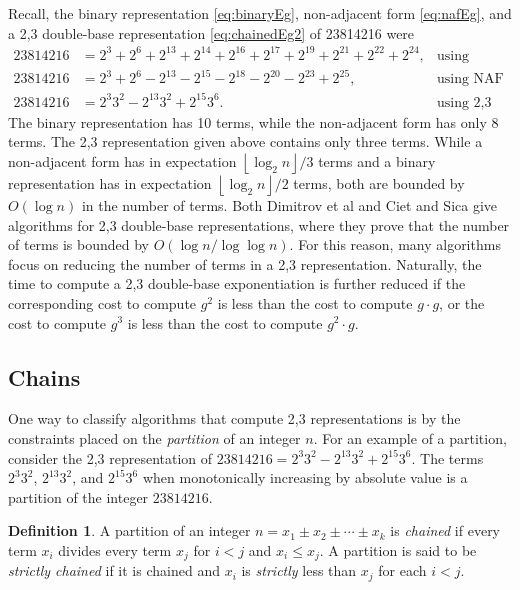 \documentclass{ucalgthes1}
\theoremstyle{definition}
\newtheorem{defn}[thm]{Definition}
\newcommand{\floor}[1]{\left\lfloor #1 \right\rfloor}
\begin{document}
Recall, the binary representation \eqref{eq:binaryEg}, non-adjacent form \eqref{eq:nafEg}, and a 2,3 double-base representation \eqref{eq:chainedEg2} of 23814216 were
\begin{align*}
	23814216 &= 2^3+2^6+2^{13}+2^{14}+2^{16}+2^{17}+2^{19}+2^{21}+2^{22}+2^{24}, & \mbox{using binary} \\
	23814216 &= 2^3+2^6-2^{13}-2^{15}-2^{18}-2^{20}-2^{23}+2^{25}, & \mbox{using NAF} \\
	23814216 &= 2^3 3^2 -2^{13} 3^2 +2^{15} 3^6. & \mbox{using 2,3 DBNS}
\end{align*}
The binary representation has 10 terms, while the non-adjacent form has only 8 terms.  The 2,3 representation given above contains only three terms.  While a non-adjacent form has in expectation $\floor{\log_2 n}/3$ terms and a binary representation has in expectation $\floor{\log_2 n}/2$ terms, both are bounded by $O(\log n)$ in the number of terms.  Both Dimitrov et al \cite{Dimitrov2008} and Ciet and Sica \cite{Ciet2005} give algorithms for 2,3 double-base representations, where they prove that the number of terms is bounded by $O(\log n / \log \log n)$.  For this reason, many algorithms focus on reducing the number of terms in a 2,3 representation.   Naturally, the time to compute a 2,3 double-base exponentiation is further reduced if the corresponding cost to compute $g^2$ is less than the cost to compute $g \cdot g$, or the cost to compute $g^3$ is less than the cost to compute $g^2 \cdot g$. 

\bigbreak
\subsection{Chains}
\label{subsec:dbnsChains}

One way to classify algorithms that compute 2,3 representations is by the constraints placed on the \emph{partition} of an integer $n$.  For an example of a partition, consider the 2,3 representation of $23814216 = 2^3 3^2 -2^{13} 3^2 +2^{15} 3^6$.  The terms $2^3 3^2$, $2^{13} 3^2$, and $2^{15} 3^6$ when monotonically increasing by absolute value is a partition of the integer $23814216$.  

\begin{defn}
A partition of an integer $n = x_1 \pm x_2 \pm \cdots \pm x_k$ is \emph{chained} if every term $x_i$ divides every term $x_j$ for $i < j$ and $x_i \le x_j$. A partition is said to be \emph{strictly chained} if it is chained and $x_i$ is \emph{strictly} less than $x_j$ for each $i < j$.
\end{defn}
\end{document}
